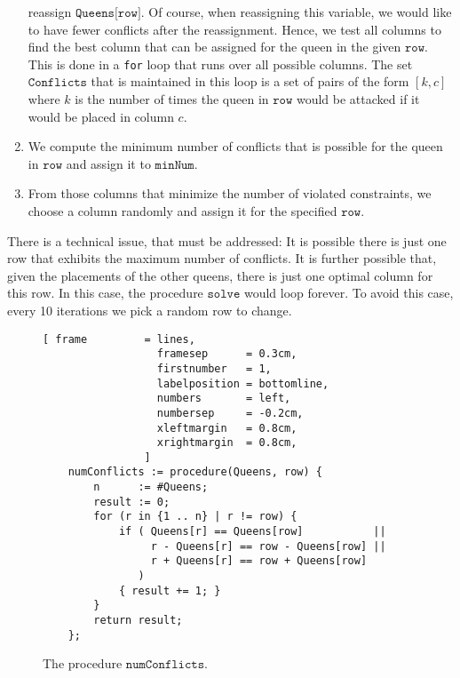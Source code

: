 \begin{enumerate}
      reassign $\texttt{Queens[row]}$.  Of course, when reassigning this variable, we would like to have fewer
      conflicts after the reassignment.  Hence, we test all columns to find the best column that can be
      assigned for the queen in the given $\texttt{row}$.  This is done in a \texttt{for} loop that runs over
      all possible columns.  The set $\texttt{Conflicts}$ that is maintained in this loop is a set of pairs
      of the form $[k, c]$ where $k$ is the number of times the queen in $\texttt{row}$ would be attacked if it
      would be placed in column $c$.
\item We compute the minimum number of conflicts that is possible for the queen in $\texttt{row}$ and assign it
      to $\texttt{minNum}$.
\item From those columns that minimize the number of violated constraints, we choose a column randomly
      and assign it for the specified $\texttt{row}$.
\end{enumerate}
There is a technical issue, that must be addressed:  It is possible there is just one row that exhibits the
maximum number of conflicts.  It is further possible that, given the placements of the other queens, there is
just one optimal column for this row.  In this case, the procedure $\texttt{solve}$ would loop forever.  To
avoid this case, every 10 iterations we pick a random row to change.

\begin{figure}[!ht]
\centering
\begin{Verbatim}[ frame         = lines, 
                  framesep      = 0.3cm, 
                  firstnumber   = 1,
                  labelposition = bottomline,
                  numbers       = left,
                  numbersep     = -0.2cm,
                  xleftmargin   = 0.8cm,
                  xrightmargin  = 0.8cm,
                ]
    numConflicts := procedure(Queens, row) {
        n      := #Queens;
        result := 0;
        for (r in {1 .. n} | r != row) {
            if ( Queens[r] == Queens[row]           ||
                 r - Queens[r] == row - Queens[row] ||
                 r + Queens[r] == row + Queens[row]
               )
            { result += 1; }
        }
        return result;
    };
\end{Verbatim}
\vspace*{-0.3cm}
\caption{The procedure $\texttt{numConflicts}$.}
\label{fig:numConficts.stlx}
\end{figure}

